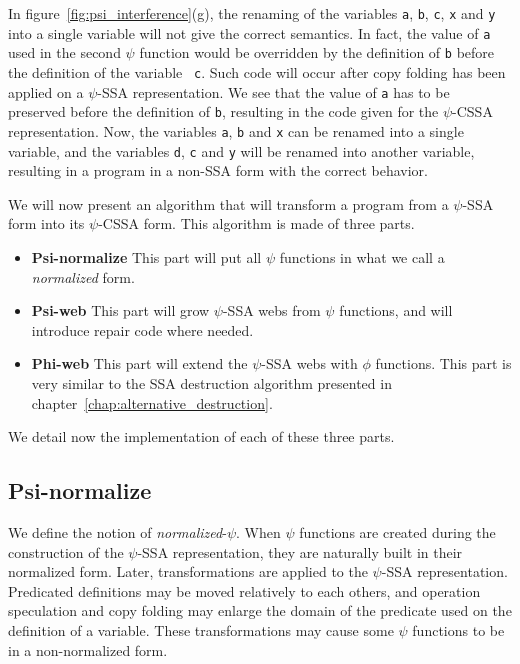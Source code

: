 In figure~\ref{fig:psi_interference}(g), the renaming of the variables
{\tt a}, {\tt b}, {\tt c}, {\tt x} and {\tt y} into a single variable
will not give the correct semantics. In fact, the value of {\tt a}
used in the second $\psi$ function would be overridden by the
definition of {\tt b} before the definition of the variable {\tt
  c}. Such code will occur after copy folding has been applied on a
$\psi$-SSA representation. We see that the value of {\tt a} has to be
preserved before the definition of {\tt b}, resulting in the code
given for the $\psi$-CSSA representation. Now, the variables {\tt a},
{\tt b} and {\tt x} can be renamed into a single variable, and the
variables {\tt d}, {\tt c} and {\tt y} will be renamed into another
variable, resulting in a program in a non-SSA form with the correct
behavior.

We will now present an algorithm that will transform a program from a
$\psi$-SSA form into its $\psi$-CSSA form. This algorithm is made of
three parts.

\begin{itemize}
\item {\bf Psi-normalize} This part will put all $\psi$ functions
in what we call a {\em normalized} form.
\item {\bf Psi-web} This part will grow $\psi$-SSA webs from $\psi$
  functions, and will introduce repair code where needed.
\item {\bf Phi-web} This part will extend the $\psi$-SSA webs with
  $\phi$ functions. This part is very similar to the SSA destruction
  algorithm presented in chapter~\ref{chap:alternative_destruction}.
\end{itemize}

We detail now the implementation of each of these three parts.

\subsection{Psi-normalize}

We define the notion of {\em normalized}-$\psi$. When $\psi$ functions
are created during the construction of the $\psi$-SSA representation,
they are naturally built in their normalized form. Later,
transformations are applied to the $\psi$-SSA representation.
Predicated definitions may be moved relatively to each others, and
operation speculation and copy folding may enlarge the domain of the
predicate used on the definition of a variable. These transformations
may cause some $\psi$ functions to be in a non-normalized form.

